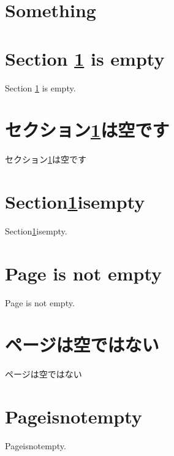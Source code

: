 \documentclass[twocolumn]{jarticle}
\begin{document}
\tableofcontents
\section{Something}\label{a}
\section{Section \ref{a} is empty}
Section \ref{a} is empty.
\section{セクション\ref{a}は空です}
セクション\ref{a}は空です
\section{Section\ref{a}isempty}
Section\ref{a}isempty.
\section{Page \pageref{a} is not empty}
Page \pageref{a} is not empty.
\section{ページ\pageref{a}は空ではない}
ページ\pageref{a}は空ではない
\section{Page\pageref{a}isnotempty}
Page\pageref{a}isnotempty.
\end{document}
